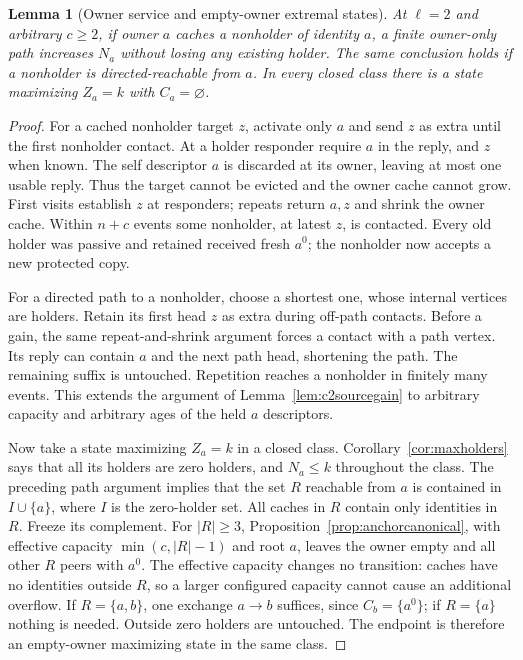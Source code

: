 \documentclass[11pt]{article}
\newtheorem{lemma}[theorem]{Lemma}
\begin{document}
\begin{lemma}[Owner service and empty-owner extremal states]
\label{lem:generalownerservice}
At $\ell=2$ and arbitrary $c\ge2$, if owner $a$ caches
a nonholder of identity $a$, a finite owner-only path
increases $N_a$ without losing any existing holder.
The same conclusion holds if a nonholder is directed-reachable
from $a$. In every closed class there is a state maximizing
$Z_a=k$ with $C_a=\varnothing$.
\end{lemma}
\begin{proof}
For a cached nonholder target $z$, activate only $a$ and
send $z$ as extra until the first nonholder contact.
At a holder responder require $a$ in the reply, and $z$
when known. The self descriptor $a$ is discarded at its
owner, leaving at most one usable reply. Thus the target
cannot be evicted and the owner cache cannot grow.
First visits establish $z$ at responders; repeats return
$a,z$ and shrink the owner cache. Within $n+c$ events
some nonholder, at latest $z$, is contacted. Every old
holder was passive and retained received fresh $a^0$;
the nonholder now accepts a new protected copy.

For a directed path to a nonholder, choose a shortest
one, whose internal vertices are holders. Retain its
first head $z$ as extra during off-path contacts.
Before a gain, the same repeat-and-shrink argument forces
a contact with a path vertex. Its reply can contain
$a$ and the next path head, shortening the path. The
remaining suffix is untouched. Repetition reaches a
nonholder in finitely many events. This extends the
argument of Lemma~\ref{lem:c2sourcegain} to arbitrary
capacity and arbitrary ages of the held $a$ descriptors.

Now take a state maximizing $Z_a=k$ in a closed class.
Corollary~\ref{cor:maxholders} says that all its holders
are zero holders, and $N_a\le k$ throughout the class.
The preceding path argument implies that the set $R$
reachable from $a$ is contained in $I\cup\{a\}$, where
$I$ is the zero-holder set. All caches in $R$ contain
only identities in $R$. Freeze its complement. For
$|R|\ge3$, Proposition~\ref{prop:anchorcanonical}, with
effective capacity $\min(c,|R|-1)$ and root $a$, leaves
the owner empty and all other $R$ peers with $a^0$.
The effective capacity changes no transition: caches
have no identities outside $R$, so a larger configured
capacity cannot cause an additional overflow.
If $R=\{a,b\}$, one exchange $a\to b$ suffices,
since $C_b=\{a^0\}$; if $R=\{a\}$ nothing is needed.
Outside zero holders are untouched. The endpoint is
therefore an empty-owner maximizing state in the same class.
\end{proof}
\end{document}
